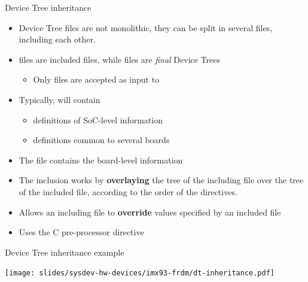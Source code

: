 \begin{frame}[fragile]{Device Tree inheritance}
  \begin{itemize}
  \item Device Tree files are not monolithic, they can be split in
    several files, including each other.
  \item {} files are included files, while  files
    are {\em final} Device Trees
    \begin{itemize}
    \item Only  files are accepted as input to 
    \end{itemize}
  \item Typically,  will contain
    \begin{itemize}
    \item definitions of SoC-level information
    \item definitions common to several boards
    \end{itemize}
  \item The  file contains the board-level information
  \item The inclusion works by {\bf overlaying} the tree of the
    including file over the tree of the included file,
    according to the order of the  directives. 
  \item Allows an including file to {\bf override} values specified by
    an included file
  \item Uses the C pre-processor  directive
  \end{itemize}
\end{frame}

\begin{frame}{Device Tree inheritance example}
  \begin{center}
    \texttt{[image: slides/sysdev-hw-devices/imx93-frdm/dt-inheritance.pdf]}
  \end{center}
\end{frame}

